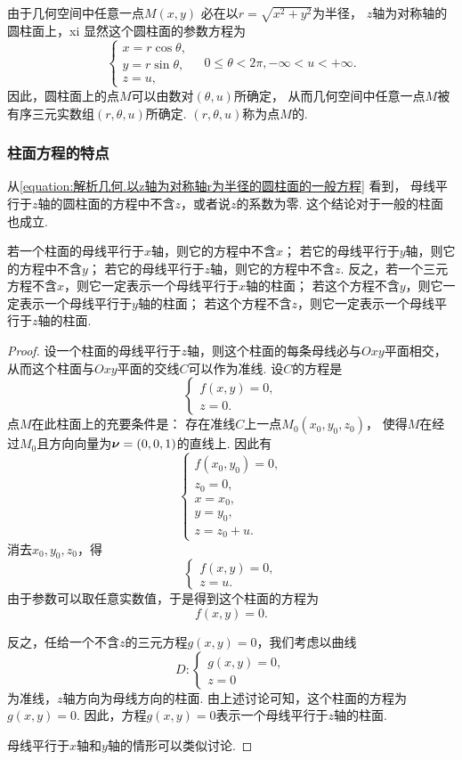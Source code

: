 由于几何空间中任意一点\(M(x,y)\)
必在以\(r=\sqrt{x^2+y^2}\)为半径，
\(z\)轴为对称轴的圆柱面上，xi
显然这个圆柱面的参数方程为\[
	\left\{ \begin{array}{l}
		x = r \cos\theta, \\
		y = r \sin\theta, \\
		z = u,
	\end{array} \right.
	\quad 0\leqslant \theta < 2\pi,
	-\infty < u < +\infty.
\]
因此，圆柱面上的点\(M\)可以由数对\((\theta,u)\)所确定，
从而几何空间中任意一点\(M\)被有序三元实数组\((r,\theta,u)\)所确定.
\((r,\theta,u)\)称为点\(M\)的.

\subsubsection{柱面方程的特点}
从\cref{equation:解析几何.以z轴为对称轴r为半径的圆柱面的一般方程} 看到，
母线平行于\(z\)轴的圆柱面的方程中不含\(z\)，或者说\(z\)的系数为零.
这个结论对于一般的柱面也成立.
\begin{theorem}
若一个柱面的母线平行于\(x\)轴，则它的方程中不含\(x\)；
若它的母线平行于\(y\)轴，则它的方程中不含\(y\)；
若它的母线平行于\(z\)轴，则它的方程中不含\(z\).
反之，若一个三元方程不含\(x\)，则它一定表示一个母线平行于\(x\)轴的柱面；
若这个方程不含\(y\)，则它一定表示一个母线平行于\(y\)轴的柱面；
若这个方程不含\(z\)，则它一定表示一个母线平行于\(z\)轴的柱面.
\begin{proof}
设一个柱面的母线平行于\(z\)轴，则这个柱面的每条母线必与\(Oxy\)平面相交，
从而这个柱面与\(Oxy\)平面的交线\(C\)可以作为准线.
设\(C\)的方程是\[
	\left\{ \begin{array}{l}
		f(x,y) = 0, \\
		z = 0.
	\end{array} \right.
\]
点\(M\)在此柱面上的充要条件是：
存在准线\(C\)上一点\(M_0(x_0,y_0,z_0)\)，
使得\(M\)在经过\(M_0\)且方向向量为\(\boldsymbol{\nu}=(0,0,1)\)的直线上.
因此有\[
	\left\{ \begin{array}{l}
		f(x_0,y_0) = 0, \\
		z_0 = 0, \\
		x = x_0, \\
		y = y_0, \\
		z = z_0 + u.
	\end{array} \right.
\]
消去\(x_0,y_0,z_0\)，得\[
	\left\{ \begin{array}{l}
		f(x,y) = 0, \\
		z = u.
	\end{array} \right.
\]
由于参数可以取任意实数值，于是得到这个柱面的方程为\[
	f(x,y) = 0.
\]

反之，任给一个不含\(z\)的三元方程\(g(x,y)=0\)，我们考虑以曲线\[
	D: \left\{ \begin{array}{l}
		g(x,y) = 0, \\
		z = 0
	\end{array} \right.
\]
为准线，\(z\)轴方向为母线方向的柱面.
由上述讨论可知，这个柱面的方程为\(g(x,y)=0\).
因此，方程\(g(x,y)=0\)表示一个母线平行于\(z\)轴的柱面.

母线平行于\(x\)轴和\(y\)轴的情形可以类似讨论.
\end{proof}
\end{theorem}

